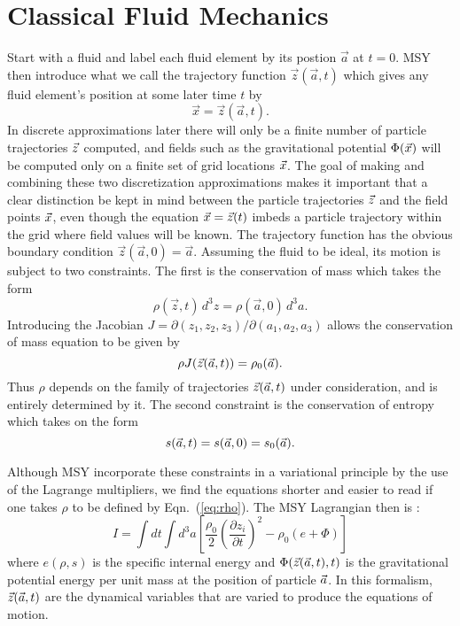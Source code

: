     \section{Classical Fluid Mechanics}\label{cfm}
    Start with a fluid and label each fluid element by its postion 
${\vec a}$ at $t=0$.  
    MSY then introduce what we call the trajectory function ${\vec
z}({\vec a},t)$ which gives any fluid element's position at some
later time $t$ by 
    \begin{equation} 
    {\vec x} = {\vec z}({\vec a},t) .
    \end{equation} 
    In discrete approximations later there will only be a finite
number of particle trajectories ${\vec z}$ computed, and fields such as the
gravitational potential $\Phi({\vec x})$ will be computed only on a finite
set of grid locations ${\vec x}$.
    The goal of making and combining these two discretization
approximations makes it important that a clear distinction be kept in
mind between the particle trajectories ${\vec z}$ and the field points
${\vec x}$, even though the equation ${\vec x} = {\vec z}(t)$ imbeds a particle
trajectory within the grid where field values will be known.
    The trajectory function has the obvious boundary condition ${\vec
z}({\vec a},0) = {\vec a}$.  
    Assuming the fluid to be ideal, its motion is subject to two
constraints.  
    The first is the conservation of mass which takes the form 
    \begin{equation} 
    \rho({\vec z},t)\,d^3 z = \rho({\vec a},0)\,d^3 a. 
    \end{equation} 
    Introducing the Jacobian $J =
{\partial(z_1,z_2,z_3)}/{\partial(a_1,a_2,a_3)}$ allows the
conservation of mass equation to be given by 
    \begin{equation}\label{eq:rho}
    \rho J({\vec z}({\vec a},t)) = \rho_0({\vec a}) .  
    \end{equation} 
    Thus $\rho$ depends on the family of trajectories ${\vec z}({\vec a},t)$
under consideration, and is entirely determined by it.
    The second constraint is the conservation of entropy which takes
on the form
    \begin{equation} 
    s({\vec a},t) = s({\vec a},0) = s_0(\vec a) . 
    \end{equation}

Although MSY incorporate these constraints in a variational principle
by the use of the Lagrange multipliers, we find the equations shorter
and easier to read if one takes $\rho$ to be defined by
Eqn.~(\ref{eq:rho}). 
    The MSY Lagrangian then is :
    \begin{equation}\label{eq:MSY}
    I  =  \int\!\! dt \int\!\! d^3a \left[\frac{\rho_0}{2} \left(
\frac{\partial z_i}{\partial t}\right)^2 - \rho_0(e+\Phi) \right]
    \end{equation} 
    where $e(\rho,s)$ is the specific internal energy and
$\Phi({\vec z}({\vec a},t),t)$ is the gravitational potential energy per unit
mass at the position of particle ${\vec a}$.  
    In this formalism, ${\vec z}({\vec a},t)$ are the dynamical variables
that are varied to produce the equations of motion.

